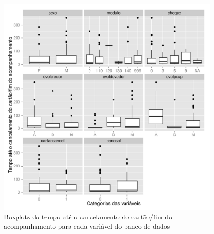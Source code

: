 \documentclass{article}\usepackage[]{graphicx}\usepackage[]{color}
\makeatletter
\def\maxwidth{ %
  \ifdim\Gin@nat@width>\linewidth
    \linewidth
  \else
    \Gin@nat@width
  \fi
}
\newenvironment{knitrout}{}{} %
\makeatother
\begin{document}
\begin{figure}[t!]

\centering
\begin{knitrout}
\color{fgcolor}
\includegraphics[width=\maxwidth]{figure/unnamed-chunk-5} 

\end{knitrout}
\caption{Boxplots do tempo até o cancelamento do cartão/fim do acompanhamento para cada variável do banco de dados}
\end{figure}
\end{document}
